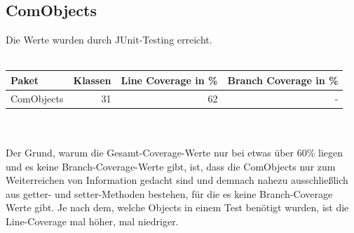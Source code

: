 \documentclass[a4paper]{article}
\begin{document}
\subsection{ComObjects}
Die Werte wurden durch JUnit-Testing erreicht.
 \ \\ \ \\ 	
	\noindent
	\begin{tabular}{|l|r|r|r|} \hline
	Paket & Klassen & Line Coverage in \% & Branch Coverage in \% \\ \hline \hline
	ComObjects & 31 & 62 & -\\ \hline
\end{tabular}
 \ \\ \ \\ 
Der Grund, warum die Gesamt-Coverage-Werte nur bei etwas über 60\% liegen und es keine Branch-Coverage-Werte gibt, ist, dass die ComObjects nur zum Weiterreichen von Information gedacht sind und demnach nahezu ausschließlich aus getter- und setter-Methoden bestehen, für die es keine Branch-Coverage Werte gibt. Je nach dem, welche Objects in einem Test benötigt wurden, ist die Line-Coverage mal höher, mal niedriger. \\
\ \\
\end{document}
